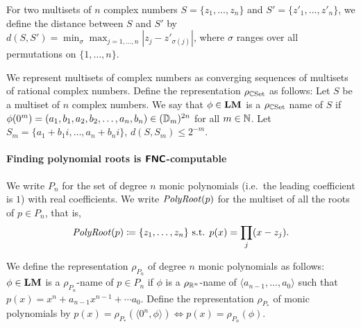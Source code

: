 \documentclass[envcountsame,orivec,oribibl]{llncs}
\begin{document}
For two multisets of $n$ complex numbers $S = \{z_1, \dots, z_n\}$ and $S' = \{z'_1, \dots, z'_n\}$,
we define the distance between $S$ and $S'$ by $
d(S, S') = \min_{\sigma} \max_{j = 1, \ldots, n}|z_j - z'_{\sigma(j)}|$,
where $\sigma$ ranges over all permutations on $\{1, \ldots, n\}$. 

We represent multisets of complex numbers as converging sequences of 
multisets of rational complex numbers.
Define the representation $\rho_{\mathbb C\mathrm{Set}}$ as follows:
Let $S$ be a multiset of $n$ complex numbers. 
We say that $\phi \in \mathbf{LM}$ is a $\rho_{\mathbb C\mathrm{Set}}$ name of $S$ if
$\phi(0^m) = ( a_1, b_1, a_2, b_2, \dots, a_n, b_n ) \in (\mathbb D_m)^{2n}$
for all $m \in \mathbb N$.
Let $S_m = \{a_1+b_1 i, \dots, a_n+b_n i\}$, 
$d(S, S_m) \le 2^{-m}$.




\paragraph{Finding polynomial roots is $\text{\bfseries \sffamily \upshape FNC}$-computable}

We write $P_n$ for the set of degree $n$ monic 
polynomials (i.e.\ the leading coefficient is $1$) with real coefficients.
We write $\mathit{PolyRoot}(p)$ for the multiset of all the roots of $p \in P_n$, that is,
\begin{equation}
 \mathit{PolyRoot}(p) \coloneqq \{ z_1, \dots, z_n \} \text{ s.t. } p(x) = \prod_j (x - z_j).
\end{equation}

We define the representation $\rho_{P_n}$ of degree $n$ monic polynomials as follows: 
$\phi \in \mathbf{LM}$ is a $\rho_{P_n}$-name of $p \in P_n$ 
if $\phi$ is a $\rho_{\mathbb R^n}$-name of $\langle a_{n-1}, \dots, a_0 \rangle$ 
such that $p(x) = x^n + a_{n-1}x^{n-1} + \cdots a_0$.
Define the representation $\rho_{P_*}$ of monic polynomials by
$p(x) = \rho_{P_*}(\langle 0^n, \phi \rangle) \iff p(x) = \rho_{P_n}(\phi)$.
\end{document}
